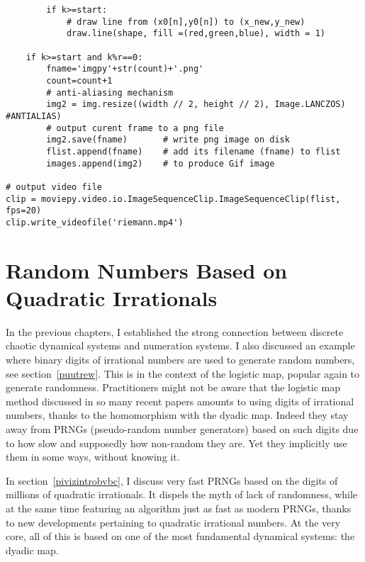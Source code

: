 \documentclass[oneside,10pt]{book}
\newcommand\Chapter[2]{
  \chapter[#1]{#1\\[2ex]\Large\itshape#2}
}
\begin{document}
\begin{lstlisting}
        if k>=start:
            # draw line from (x0[n],y0[n]) to (x_new,y_new)
            draw.line(shape, fill =(red,green,blue), width = 1)

    if k>=start and k%r==0:
        fname='imgpy'+str(count)+'.png'
        count=count+1
        # anti-aliasing mechanism
        img2 = img.resize((width // 2, height // 2), Image.LANCZOS) #ANTIALIAS)
        # output curent frame to a png file
        img2.save(fname)       # write png image on disk
        flist.append(fname)    # add its filename (fname) to flist
        images.append(img2)    # to produce Gif image

# output video file
clip = moviepy.video.io.ImageSequenceClip.ImageSequenceClip(flist, fps=20)
clip.write_videofile('riemann.mp4')
\end{lstlisting}






\Chapter{Random Numbers Based on Quadratic Irrationals}{}\label{chapterPRNG}


In the previous chapters, I established the strong connection between discrete chaotic dynamical systems and numeration systems.
I also discussed an example where binary digits of irrational numbers are used  to generate random numbers, see
 section~\ref{puutrew}. This is in the context of the logistic map,  popular again to generate randomness. Practitioners might not be aware that the logistic map method discussed in so many recent papers amounts to using digits of irrational numbers,
 thanks to the homomorphism with the dyadic map. Indeed they stay away from PRNGs (pseudo-random number generators) based on such digits due to how slow and supposedly how non-random they are. Yet they implicitly use them in some ways, without knowing it.

In section~\ref{pivizintrobvbc},
 I discuss very fast PRNGs based on the digits of millions of quadratic irrationals. It dispels the myth of lack of randomness, while at the same time featuring an algorithm just as fast as modern PRNGs, thanks to new developments pertaining to quadratic irrational numbers. At the very core, all of this is based on one of the most fundamental dynamical systems: the dyadic map.
\end{document}
